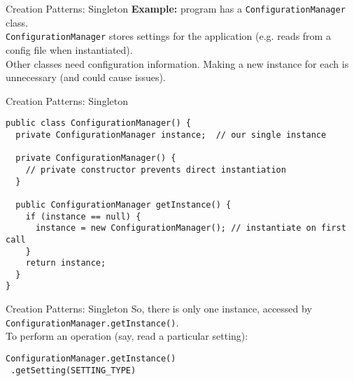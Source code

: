 \documentclass[14pt,aspectratio=169]{beamer}
\begin{document}
\begin{frame}[fragile]{Creation Patterns: Singleton}
\textbf{Example:} program has a \texttt{ConfigurationManager} class.\\
\vspace{1em}
\texttt{ConfigurationManager} stores settings for the application (e.g. reads from a config file when instantiated). \\
\vspace{1em}
Other classes need configuration information. Making a new instance for each is unnecessary (and could cause issues). \\
\end{frame}



\begin{frame}[fragile]{Creation Patterns: Singleton}
\begin{Verbatim}[fontsize=\footnotesize]
public class ConfigurationManager() {
  private ConfigurationManager instance;  // our single instance
  
  private ConfigurationManager() {
    // private constructor prevents direct instantiation
  }
  
  public ConfigurationManager getInstance() {
    if (instance == null) {
      instance = new ConfigurationManager(); // instantiate on first call
    }
    return instance;
  }
}  
\end{Verbatim}
\end{frame}



\begin{frame}[fragile]{Creation Patterns: Singleton}
So, there is only one instance, accessed by \texttt{ConfigurationManager.getInstance()}.\\
\vspace{1em}
To perform an operation (say, read a particular setting): \\ 
\begin{Verbatim}[fontsize=\normalsize]
ConfigurationManager.getInstance()
 .getSetting(SETTING_TYPE)
\end{Verbatim}
\end{frame}
\end{document}
